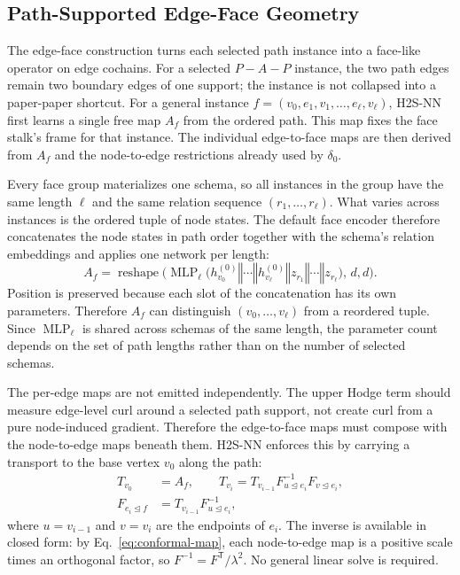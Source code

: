 \documentclass[sigconf,anonymous,review]{acmart}
\newcommand{\method}{\textsc{H2S-NN}}
\newcommand{\transpose}{\mathsf{T}}
\newcommand{\concat}{\mathbin\Vert}
\begin{document}
\subsection{Path-Supported Edge-Face Geometry}
\label{sec:face-geometry}

The edge-face construction turns each selected path instance into a face-like operator on edge
cochains.  For a selected \(P\!-\!A\!-\!P\) instance, the two path edges remain two boundary edges
of one support; the instance is not collapsed into a paper-paper shortcut.  For a general instance
\(f=(v_0,e_1,v_1,\ldots,e_\ell,v_\ell)\), \method{} first learns a single free map \(A_f\) from the
ordered path.  This map fixes the face stalk's frame for that instance.  The individual
edge-to-face maps are then derived from \(A_f\) and the node-to-edge restrictions already used by
\(\delta_0\).

Every face group materializes one schema, so all instances in the group have the same length
\(\ell\) and the same relation sequence \((r_1,\ldots,r_\ell)\).  What varies across instances is
the ordered tuple of node states.  The default face encoder therefore concatenates the node states
in path order together with the schema's relation embeddings and applies one network per length:
\begin{equation}
  A_f
  =\operatorname{reshape}\!\Big(
    \operatorname{MLP}_{\ell}\big(
      h_{v_0}^{(0)}\concat\cdots\concat h_{v_\ell}^{(0)}
      \concat z_{r_1}\concat\cdots\concat z_{r_\ell}
    \big),\,d,d\Big).
  \label{eq:face-map}
\end{equation}
Position is preserved because each slot of the concatenation has its own parameters.  Therefore
\(A_f\) can distinguish \((v_0,\ldots,v_\ell)\) from a reordered tuple.  Since
\(\operatorname{MLP}_\ell\) is shared across schemas of the same length, the parameter count depends
on the set of path lengths rather than on the number of selected schemas.

The per-edge maps are not emitted independently.  The upper Hodge term should measure edge-level
curl around a selected path support, not create curl from a pure node-induced gradient.  Therefore
the edge-to-face maps must compose with the node-to-edge maps beneath them.  \method{} enforces this
by carrying a transport to the base vertex \(v_0\) along the path:
\begin{equation}
  \begin{aligned}
  T_{v_0}&=A_f,
  \qquad
  T_{v_i}=T_{v_{i-1}}F_{u\unlhd e_i}^{-1}F_{v\unlhd e_i},\\
  F_{e_i\unlhd f}&=T_{v_{i-1}}F_{u\unlhd e_i}^{-1},
  \end{aligned}
  \label{eq:transport}
\end{equation}
where \(u=v_{i-1}\) and \(v=v_i\) are the endpoints of \(e_i\).  The inverse is available in closed
form: by Eq.~\eqref{eq:conformal-map}, each node-to-edge map is a positive scale times an
orthogonal factor, so \(F^{-1}=F^{\transpose}/\lambda^2\).  No general linear solve is required.
\end{document}
